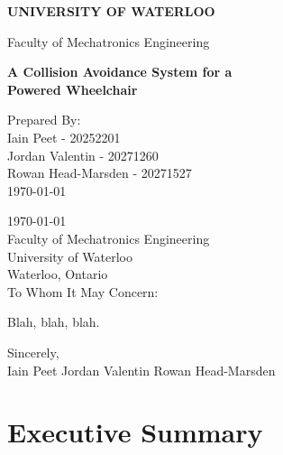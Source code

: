 \documentclass[oneside,final,a4paper]{report}
\begin{document}
\pagestyle{empty}

\begin{flushright}
 \begin{LARGE}
  \textbf{UNIVERSITY OF WATERLOO}
 \end{LARGE}

 \begin{large}
  Faculty of Mechatronics Engineering\\[4cm]
 \end{large}

 \begin{LARGE}
  \textbf{A Collision Avoidance System for a}\\
  \textbf{Powered Wheelchair}
 \end{LARGE}

 \vfill

  Prepared By: \\[0.2cm]
  Iain Peet - 20252201\\
  Jordan Valentin - 20271260\\
  Rowan Head-Marsden - 20271527\\
  \today
\end{flushright}
\clearpage

\today \\[0.5cm]

Faculty of Mechatronics Engineering \\
University of Waterloo \\
Waterloo, Ontario \\

To Whom It May Concern:

Blah, blah, blah.

Sincerely, \\[1cm]

Iain Peet \hspace{2cm} Jordan Valentin \hspace{2cm} Rowan Head-Marsden
\clearpage

\pagestyle{plain}
\setcounter{page}{1}

\setcounter{tocdepth}{1}
\tableofcontents

\listoffigures
{}

\chapter*{Executive Summary}
\end{document}
